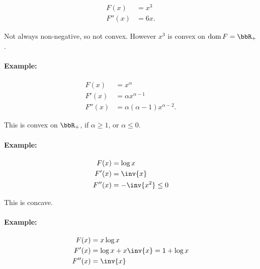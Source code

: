 \begin{dmath}\label{eqn:convexOptimizationLecture7:40}
\begin{aligned}
F(x) &= x^3  \\
F''(x) &= 6 x.
\end{aligned}
\end{dmath}

Not always non-negative, so not convex.  However \( x^3 \) is convex on \( \dom F = \bbR_{+} \).

\paragraph{Example:}

\begin{dmath}\label{eqn:convexOptimizationLecture7:60}
\begin{aligned}
F(x) &= x^\alpha \\
F'(x) &= \alpha x^{\alpha-1} \\
F''(x) &= \alpha(\alpha-1) x^{\alpha-2}.
\end{aligned}
\end{dmath}


This is convex on \( \bbR_{+} \), if \( \alpha \ge 1 \), or \( \alpha \le 0 \).

\paragraph{Example:}

\begin{dmath}\label{eqn:convexOptimizationLecture7:80}
\begin{aligned}
F(x) &= \log x \\
F'(x) &= \inv{x} \\
F''(x) &= -\inv{x^2} \le 0
\end{aligned}
\end{dmath}

This is concave.

\paragraph{Example:}

\begin{dmath}\label{eqn:convexOptimizationLecture7:100}
\begin{aligned}
F(x) &= x\log x \\
F'(x) &= \log x + x \inv{x} = 1 + \log x \\
F''(x) &= \inv{x}
\end{aligned}
\end{dmath}

